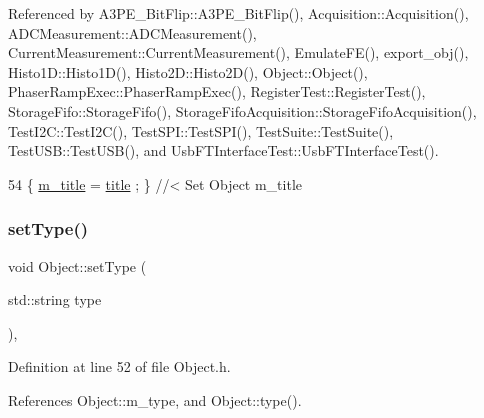 Referenced by A3\+P\+E\+\_\+\+Bit\+Flip\+::\+A3\+P\+E\+\_\+\+Bit\+Flip(), Acquisition\+::\+Acquisition(), A\+D\+C\+Measurement\+::\+A\+D\+C\+Measurement(), Current\+Measurement\+::\+Current\+Measurement(), Emulate\+F\+E(), export\+\_\+obj(), Histo1\+D\+::\+Histo1\+D(), Histo2\+D\+::\+Histo2\+D(), Object\+::\+Object(), Phaser\+Ramp\+Exec\+::\+Phaser\+Ramp\+Exec(), Register\+Test\+::\+Register\+Test(), Storage\+Fifo\+::\+Storage\+Fifo(), Storage\+Fifo\+Acquisition\+::\+Storage\+Fifo\+Acquisition(), Test\+I2\+C\+::\+Test\+I2\+C(), Test\+S\+P\+I\+::\+Test\+S\+P\+I(), Test\+Suite\+::\+Test\+Suite(), Test\+U\+S\+B\+::\+Test\+U\+S\+B(), and Usb\+F\+T\+Interface\+Test\+::\+Usb\+F\+T\+Interface\+Test().


\begin{DoxyCode}
54 \{ \hyperlink{classObject_affbeea1953eb5163573b92fad8f75727}{m\_title} = \hyperlink{classObject_a73a0f1a41828fdd8303dd662446fb6c3}{title} ; \} \textcolor{comment}{//< Set Object m\_title}
\end{DoxyCode}
\mbox{\label{classObject_aae534cc9d982bcb9b99fd505f2e103a5}} 
\subsubsection{\texorpdfstring{set\+Type()}{setType()}}
{\footnotesize\ttfamily void Object\+::set\+Type (\begin{DoxyParamCaption}\item[{std\+::string}]{type }\end{DoxyParamCaption})\hspace{0.3cm}{\ttfamily [inline]}, {\ttfamily [inherited]}}



Definition at line 52 of file Object.\+h.



References Object\+::m\+\_\+type, and Object\+::type().



